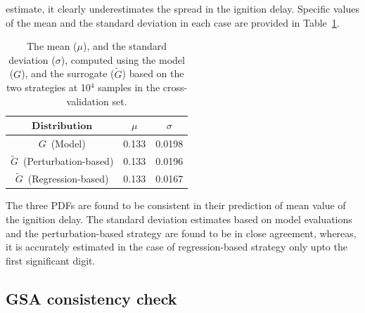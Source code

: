 estimate, it clearly underestimates the spread in the ignition delay. Specific values of the mean and the standard 
deviation in each case are provided in Table~\ref{tab:stats}. 
%
\begin{table}[htbp]
\begin{center}
\begin{tabular}{ccc}
\toprule
$\textbf{Distribution}$ & $\mu$ & $\sigma$ \\ 
\bottomrule
$G$~(Model) & 0.133 & 0.0198 \\
$\tilde{G}$~(Perturbation-based) & 0.133 & 0.0196 \\
$\tilde{G}$~(Regression-based) & 0.133 & 0.0167 \\
\bottomrule
\end{tabular}
\caption{The mean ($\mu$), and the standard deviation ($\sigma$), computed using the model ($G$), and
the surrogate ($\tilde{G}$) based on the two strategies at 10$^4$ samples in the cross-validation
set.}
\label{tab:stats}
\end{center}
\end{table}
%
The three PDFs are found to be
consistent in their prediction of mean value of the ignition delay.  The standard deviation estimates based on model
evaluations and the perturbation-based strategy are found to be in close agreement, whereas, it  is accurately
 estimated in the case of regression-based strategy only upto the first significant digit. 

\subsection{GSA consistency check}

